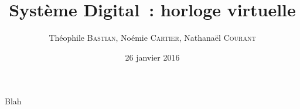 \documentclass[11pt]{beamer}
\author{Théophile \textsc{Bastian}, Noémie \textsc{Cartier}, Nathanaël \textsc{Courant}}
\title{Système Digital~: horloge virtuelle}
\date{26 janvier 2016}
\begin{document}
\begin{frame}
\titlepage
\end{frame}


\begin{frame}{Blah}

\end{frame}
\end{document}
